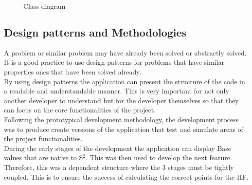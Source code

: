 \documentclass[12pt]{article} %
\begin{document}
\begin{flushleft}
\begin{figure}[H]
\caption{Class diagram}
\label{fig:speciation}
\end{figure}
\newpage
\subsection{Design patterns and Methodologies} %
A problem or similar problem may have already been solved or abstractly solved. It is a good practice to use design patterns for problems that have similar properties ones that have been solved already.\\
By using design patterns the application can present the structure of the code in a readable and understandable manner. This is very important for not only another developer to understand but for the developer themselves so that they can focus on the core functionalities of the project. \\
Following the prototypical development methodology, the development process was to produce create versions of the application that test and simulate areas of the project functionalities. \\
During the early stages of the development the application can display Base values that are native to S$^{2}$. This was then used to develop the next feature. Therefore, this was a dependent structure where the 3 stages must be tightly coupled. This is to ensure the success of calculating the correct points for the HF. \\


\end{flushleft}
\end{document}
